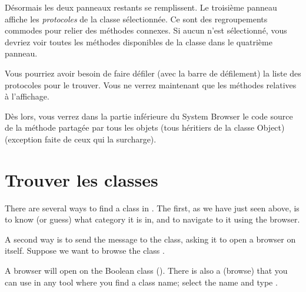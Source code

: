 \documentclass[a4paper,10pt,twoside]{book}
\begin{document}
D\'esormais les deux panneaux restants se remplissent.
Le troisi\`eme panneau affiche les \emph{protocoles} de la classe
s\'electionn\'ee.
Ce sont des regroupements commodes pour relier des m\'ethodes
connexes. Si aucun  n'est s\'electionn\'e, vous devriez
voir toutes les m\'ethodes disponibles de la classe dans le
quatri\`eme panneau.

Vous pourriez avoir besoin de faire d\'efiler (avec la barre de
d\'efilement) la liste des protocoles pour le trouver.
Vous ne verrez maintenant que les m\'ethodes relatives \`a
l'affichage.

D\`es lors, vous verrez dans la partie inf\'erieure du System Browser
le code source de la m\'ethode  partag\'ee par tous
les objets 
(tous h\'eritiers de la classe Object)
(exception faite de ceux qui la surcharge).

\section{Trouver les classes}

There are several ways to find a class in \sq.  The first, as we have just seen above, is to know (or guess) what category it is in, and to navigate to it using the browser.

A second way is to send the  message to the class, asking it to open a browser on itself.  Suppose we want to browse the class .

A browser will open on the Boolean class ().
There is also a   (browse) that you can use in any tool where you find a class name;
select the name and type .

\end{document}

